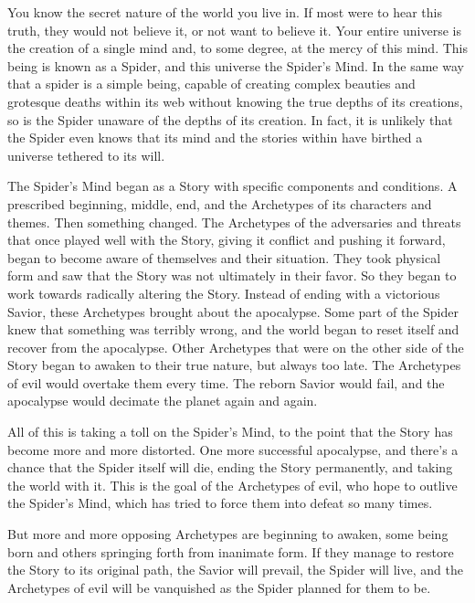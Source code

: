 \documentclass[blue]{Silversiders}
\begin{document}
\name{\bSpider{}}

You know the secret nature of the world you live in. If most were to hear this truth, they would not believe it, or not want to believe it. Your entire universe is the creation of a single mind and, to some degree, at the mercy of this mind. This being is known as a Spider, and this universe the Spider's Mind. In the same way that a spider is a simple being, capable of creating complex beauties and grotesque deaths within its web without knowing the true depths of its creations, so is the Spider unaware of the depths of its creation. In fact, it is unlikely that the Spider even knows that its mind and the stories within have birthed a universe tethered to its will.

The Spider's Mind began as a Story with specific components and conditions. A prescribed beginning, middle, end, and the Archetypes of its characters and themes. Then something changed. The Archetypes of the adversaries and threats that once played well with the Story, giving it conflict and pushing it forward, began to become aware of themselves and their situation. They took physical form and saw that the Story was not ultimately in their favor. So they began to work towards radically altering the Story. Instead of ending with a victorious Savior, these Archetypes brought about the apocalypse. Some part of the Spider knew that something was terribly wrong, and the world began to reset itself and recover from the apocalypse. Other Archetypes that were on the other side of the Story began to awaken to their true nature, but always too late. The Archetypes of evil would overtake them every time. The reborn Savior would fail, and the apocalypse would decimate the planet again and again.

All of this is taking a toll on the Spider's Mind, to the point that the Story has become more and more distorted. One more successful apocalypse, and there's a chance that the Spider itself will die, ending the Story permanently, and taking the world with it. This is the goal of the Archetypes of evil, who hope to outlive the Spider's Mind, which has tried to force them into defeat so many times.

But more and more opposing Archetypes are beginning to awaken, some being born and others springing forth from inanimate form. If they manage to restore the Story to its original path, the Savior will prevail, the Spider will live, and the Archetypes of evil will be vanquished as the Spider planned for them to be.
\end{document}
